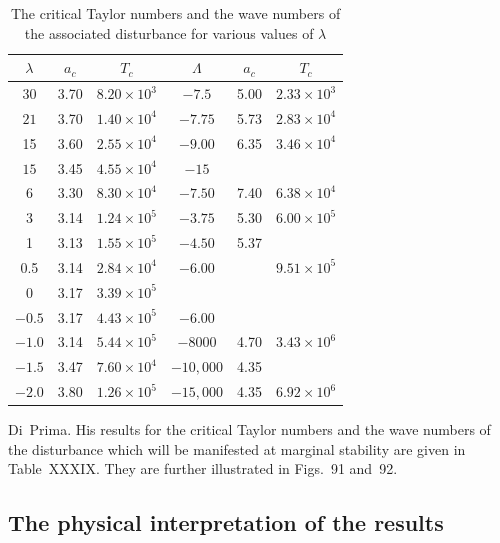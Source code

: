 \begin{table}[ht]
\centering
\caption{The critical Taylor numbers and the wave numbers of the associated disturbance for various values of $\lambda$}
\label{tab:XXXIX}
\begin{tabular}{cccccc}
\hline
$\lambda$ & $a_c$ & $T_c$ & $\Lambda$ & $a_c$ & $T_c$ \\
\hline
$30$ & 3.70 & $8.20\times 10^3$ & $-7.5$ & 5.00 & $2.33\times 10^3$ \\
$21$ & 3.70 & $1.40\times 10^4$ & $-7.75$ & 5.73 & $2.83\times 10^4$ \\
15 & 3.60 & $2.55\times 10^4$ & $-9.00$ & 6.35 & $3.46\times 10^4$ \\
$15$ & 3.45 & $4.55\times 10^4$ & $-15$ & & \\
$6$ & 3.30 & $8.30\times 10^4$ & $-7.50$ & 7.40 & $6.38\times 10^4$ \\
3 & 3.14 & $1.24\times 10^5$ & $-3.75$ & 5.30 & $6.00\times 10^5$ \\
1 & 3.13 & $1.55\times 10^5$ & $-4.50$ & 5.37 & \\
0.5 & 3.14 & $2.84\times 10^4$ & $-6.00$ & & $9.51\times 10^5$ \\
$0$ & 3.17 & $3.39\times 10^5$ & & & \\
$-0.5$ & 3.17 & $4.43\times 10^5$ & $-6.00$ & & \\
$-1.0$ & 3.14 & $5.44\times 10^5$ & $-8000$ & 4.70 & $3.43\times 10^6$ \\
$-1.5$ & 3.47 & $7.60\times 10^4$ & $-10{,}000$ & 4.35 & \\
$-2.0$ & 3.80 & $1.26\times 10^5$ & $-15{,}000$ & 4.35 & $6.92\times 10^6$ \\
\hline
\end{tabular}
\end{table}

Di~Prima. His results for the critical Taylor numbers and the wave numbers of the disturbance which will be manifested at marginal stability are given in Table~XXXIX. They are further illustrated in Figs.~91 and~92.

\subsection{The physical interpretation of the results}
\label{sec:77c}

